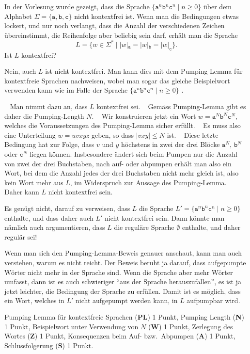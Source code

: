 In der Vorlesung wurde gezeigt, dass die Sprache
$\{\texttt{a}^n\texttt{b}^n\texttt{c}^n\;|\;n\ge 0\}$
über dem Alphabet $\Sigma=\{\texttt{a},\texttt{b},\texttt{c}\}$
nicht kontextfrei ist.
Wenn man die Bedingungen etwas lockert, und nur noch verlangt, dass die
Anzahl der verschiedenen Zeichen übereinstimmt, die Reihenfolge aber
beliebig sein darf, erhält man die Sprache
\[
L=\{w\in\Sigma^*\;|\;|w|_\texttt{a}=|w|_\texttt{b}=|w|_\texttt{c}\}.
\]
Ist $L$ kontextfrei?


\begin{loesung}
Nein, auch $L$ ist nicht kontextfrei.
Man kann dies mit dem Pumping-Lemma für kontextfreie Sprachen nachweisen,
wobei man sogar das gleiche Beispielwort verwenden kann wie im Falle der
Sprache $\{ \texttt{a}^n \texttt{b}^n \texttt{c}^n\;|\; n \ge 0\}$ .

~%
Man nimmt dazu an, dass $L$ kontextfrei sei.
~%
Gemäss Pumping-Lemma gibt es daher die Pumping-Length $N$.
~%
Wir konstruieren jetzt ein Wort
$w=\texttt{a}^N\texttt{b}^N\texttt{c}^N$, welches die Voraussetzungen
des Pumping-Lemma sicher erfüllt.
~%
Es muss also eine Unterteilung $w=uvxyz$ geben, so dass $|vxy|\le N$ ist.
~%
Diese letzte Bedingung hat zur Folge, dass $v$ und $y$ höchstens in
zwei der drei Blöcke $\texttt{a}^N$, $\texttt{b}^N$ oder $\texttt{c}^N$
liegen können.
Insbesondere ändert sich beim Pumpen nur die Anzahl von zwei der drei
Buchstaben, nach auf- oder abpumpen erhält man also ein Wort, bei dem 
die Anzahl jedes der drei Buchstaben nicht mehr gleich ist, also kein
Wort mehr aus $L$, im Widerspruch zur Aussage des Pumping-Lemma.
~%
Daher kann $L$ nicht kontextfrei sein.
\end{loesung}

\begin{diskussion}
Es genügt nicht, darauf zu verweisen, dass $L$ die Sprache
$L'=\{ \texttt{a}^n \texttt{b}^n \texttt{c}^n\;|\; n\ge 0\}$ enthalte,
und dass daher auch $L'$ nicht kontextfrei sein.  Dann könnte man nämlich auch
argumentieren, dass $L$ die reguläre Sprache $\emptyset$ enthalte, und daher
regulär sei!

Wenn man sich den Pumping-Lemma-Beweis genauer anschaut, kann man auch verstehen,
warum es nicht reicht. Der Beweis beruht ja darauf, dass aufgepumpte Wörter nicht
mehr in der Sprache sind. Wenn die Sprache aber mehr Wörter umfasst, dann ist
es auch schwieriger ``aus der Sprache herauszufallen'', es ist ja jetzt leichter,
die Bedingung der Sprache zu erfüllen. Damit ist es möglich, dass ein Wort, welches
in $L'$ nicht aufgepumpt werden kann, in $L$ aufpumpbar wird.
\end{diskussion}

\begin{bewertung}
Pumping Lemma für kontextfreie Sprachen ({\bf PL}) 1 Punkt,
Pumping Length ({\bf N}) 1 Punkt,
Beispielwort unter Verwendung von $N$ ({\bf W}) 1 Punkt,
Zerlegung des Wortes ({\bf Z}) 1 Punkt,
Konsequenzen beim Auf- bzw.~Abpumpen ({\bf A}) 1 Punkt,
Schlussfolgerung ({\bf S}) 1 Punkt.
\end{bewertung}

